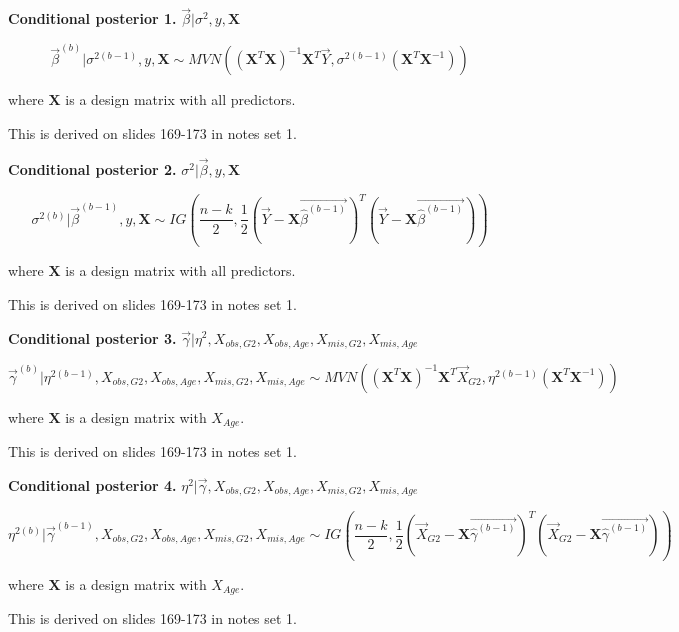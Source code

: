 \documentclass[11pt]{article}
\begin{document}
\textbf{Conditional posterior 1.} $\vec\beta | \sigma^2, y, \mathbf{X}$

$$\vec\beta^{(b)} | \sigma^{2(b - 1)}, y, \mathbf{X} \sim MVN((\mathbf{X}^T\mathbf{X})^{-1}\mathbf{X}^T\vec{Y}, \sigma^{2(b - 1)}(\mathbf{X}^T\mathbf{X}^{-1}))$$

where $\mathbf{X}$ is a design matrix with all predictors.

This is derived on slides 169-173 in notes set 1.

\vspace{0.25in}

\textbf{Conditional posterior 2.} $\sigma^2 | \vec\beta, y, \mathbf{X}$

$$\sigma^{2(b)} | \vec\beta^{(b - 1)}, y, \mathbf{X} \sim IG\left(\frac{n - k}{2}, \frac{1}{2}(\vec{Y} - \mathbf{X}\vec{\hat\beta^{(b - 1)}})^T(\vec{Y} - \mathbf{X}\vec{\hat\beta^{(b - 1)}})\right)$$

where $\mathbf{X}$ is a design matrix with all predictors.

This is derived on slides 169-173 in notes set 1.

\vspace{0.25in}

\textbf{Conditional posterior 3.} $\vec{\gamma}|\eta^2, X_{obs, G2}, X_{obs, Age}, X_{mis, G2}, X_{mis, Age}$

$$\vec{\gamma}^{(b)}|\eta^{2(b - 1)}, X_{obs, G2}, X_{obs, Age}, X_{mis, G2}, X_{mis, Age} \sim MVN((\mathbf{X}^T\mathbf{X})^{-1}\mathbf{X}^T\vec{X}_{G2}, \eta^{2(b - 1)}(\mathbf{X}^T\mathbf{X}^{-1}))$$

where $\mathbf{X}$ is a design matrix with $X_{Age}$.

This is derived on slides 169-173 in notes set 1.

\vspace{0.25in}

\textbf{Conditional posterior 4.} $\eta^2|\vec{\gamma}, X_{obs, G2}, X_{obs, Age}, X_{mis, G2}, X_{mis, Age}$

$$\eta^{2(b)}|\vec{\gamma}^{(b - 1)}, X_{obs, G2}, X_{obs, Age}, X_{mis, G2}, X_{mis, Age} \sim IG\left(\frac{n - k}{2}, \frac{1}{2}(\vec{X}_{G2} - \mathbf{X}\vec{\hat\gamma^{(b - 1)}})^T(\vec{X}_{G2} - \mathbf{X}\vec{\hat\gamma^{(b - 1)}})\right)$$

where $\mathbf{X}$ is a design matrix with $X_{Age}$.

This is derived on slides 169-173 in notes set 1.

\vspace{0.25in}
\end{document}
